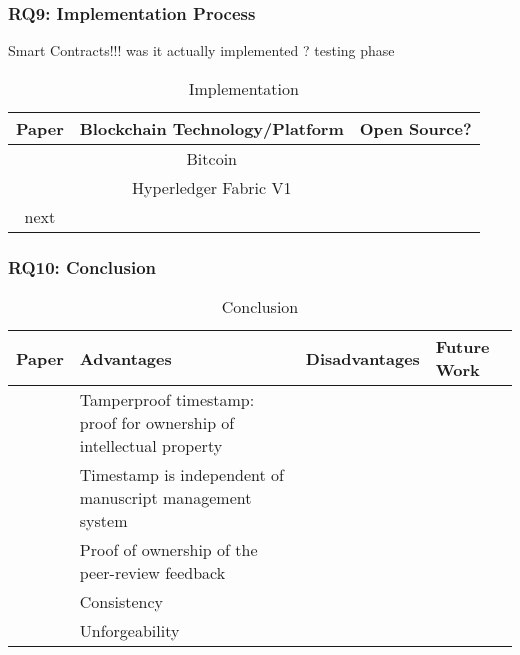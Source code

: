 \subsubsection{RQ9: Implementation Process}
Smart Contracts!!! was it actually implemented ? testing phase
\begin{longtable}{ |c|c|c| }
	\caption{Implementation}
	\label{tab:rq9_implementation_process}\\
	\hline
 	\textbf{Paper} & Blockchain Technology/Platform & \textbf{Open Source?} \\ [0.5ex] 
 	\hline\hline
 	\endhead
 	\cite{2017_Gipp} & Bitcoin & \cmark \\
	\hline
	\cite{2017_Tackmann} & Hyperledger Fabric V1 & \xmark \\
	next & \xmark \\
	\hline
\end{longtable}

\clearpage
\subsubsection{RQ10: Conclusion}

\begin{longtable}{ |c|p{4cm}|p{4cm}|p{4cm}| }
	\caption{Conclusion}
	\label{tab:rq10_conclusion}\\
	\hline
 	\textbf{Paper} & \textbf{Advantages} & \textbf{Disadvantages} & \textbf{Future Work}\\ [0.5ex] 
 	\hline\hline
 	\endhead
 	\multirow{3}{*}{\cite{2017_Gipp}} & Tamperproof timestamp: proof for ownership of intellectual property & \multirow{3}{*}{\xmark } & \\
	\cline{2-2}
	 & Timestamp is independent of manuscript management system & & \\
	\cline{2-2}
	 & Proof of ownership of the peer-review feedback & & \\
	\hline
	\multirow{3}{*}{\cite{2017_Tackmann}} & Consistency & & \\
	\cline{2-2}
	& Unforgeability & & \\
	\hline
\end{longtable}
